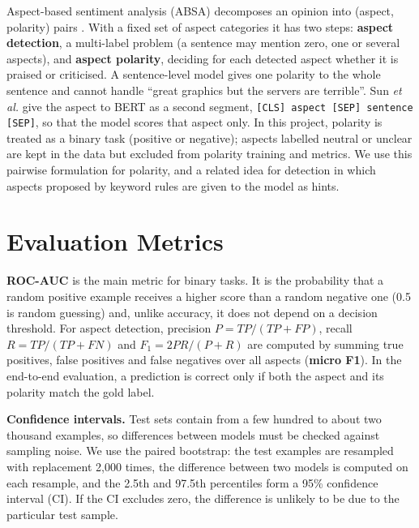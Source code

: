 Aspect-based sentiment analysis (ABSA) decomposes an opinion into (aspect, polarity) pairs \cite{Pontiki2014}. With a fixed set of aspect categories it has two steps: \textbf{aspect detection}, a multi-label problem (a sentence may mention zero, one or several aspects), and \textbf{aspect polarity}, deciding for each detected aspect whether it is praised or criticised. A sentence-level model gives one polarity to the whole sentence and cannot handle ``great graphics but the servers are terrible''. Sun \textit{et al.} \cite{SunABSA2019} give the aspect to BERT as a second segment, \texttt{[CLS] aspect [SEP] sentence [SEP]}, so that the model scores that aspect only. In this project, polarity is treated as a binary task (positive or negative); aspects labelled neutral or unclear are kept in the data but excluded from polarity training and metrics. We use this pairwise formulation for polarity, and a related idea for detection in which aspects proposed by keyword rules are given to the model as hints.

\section{Evaluation Metrics}

\textbf{ROC-AUC} is the main metric for binary tasks. It is the probability that a random positive example receives a higher score than a random negative one (0.5 is random guessing) and, unlike accuracy, it does not depend on a decision threshold. For aspect detection, precision $P = TP/(TP + FP)$, recall $R = TP/(TP + FN)$ and $F_1 = 2PR/(P + R)$ are computed by summing true positives, false positives and false negatives over all aspects (\textbf{micro F1}). In the end-to-end evaluation, a prediction is correct only if both the aspect and its polarity match the gold label.

\textbf{Confidence intervals.} Test sets contain from a few hundred to about two thousand examples, so differences between models must be checked against sampling noise. We use the paired bootstrap: the test examples are resampled with replacement 2,000 times, the difference between two models is computed on each resample, and the 2.5th and 97.5th percentiles form a 95\% confidence interval (CI). If the CI excludes zero, the difference is unlikely to be due to the particular test sample.
